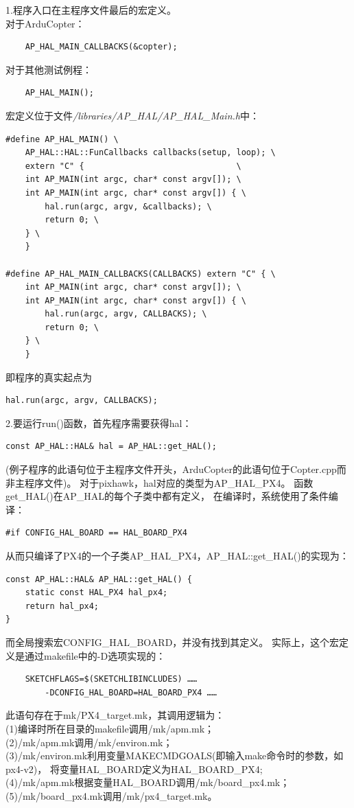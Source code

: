 \documentclass[a4paper,10pt]{ctexart} %
\begin{document}
1.程序入口在主程序文件最后的宏定义。\\
\noindent 对于ArduCopter：
\begin{lstlisting}
	AP_HAL_MAIN_CALLBACKS(&copter);
\end{lstlisting}
对于其他测试例程：
\begin{lstlisting}
	AP_HAL_MAIN();
\end{lstlisting}
宏定义位于文件\textit{/libraries/AP\_HAL/AP\_HAL\_Main.h}中：
\begin{lstlisting}
#define AP_HAL_MAIN() \
    AP_HAL::HAL::FunCallbacks callbacks(setup, loop); \
    extern "C" {                               \
    int AP_MAIN(int argc, char* const argv[]); \
    int AP_MAIN(int argc, char* const argv[]) { \
        hal.run(argc, argv, &callbacks); \
        return 0; \
    } \
    }

#define AP_HAL_MAIN_CALLBACKS(CALLBACKS) extern "C" { \
    int AP_MAIN(int argc, char* const argv[]); \
    int AP_MAIN(int argc, char* const argv[]) { \
        hal.run(argc, argv, CALLBACKS); \
        return 0; \
    } \
    }

\end{lstlisting}
即程序的真实起点为
\begin{lstlisting}
hal.run(argc, argv, CALLBACKS);
\end{lstlisting}

2.要运行run()函数，首先程序需要获得hal：
\begin{lstlisting}
const AP_HAL::HAL& hal = AP_HAL::get_HAL();
\end{lstlisting}
(例子程序的此语句位于主程序文件开头，ArduCopter的此语句位于Copter.cpp而非主程序文件)。
对于pixhawk，hal对应的类型为AP\_HAL\_PX4。
函数get\_HAL()在AP\_HAL的每个子类中都有定义，
在编译时，系统使用了条件编译：
\begin{lstlisting}
#if CONFIG_HAL_BOARD == HAL_BOARD_PX4
\end{lstlisting}
从而只编译了PX4的一个子类AP\_HAL\_PX4，AP\_HAL::get\_HAL()的实现为：
\begin{lstlisting}
const AP_HAL::HAL& AP_HAL::get_HAL() {
    static const HAL_PX4 hal_px4;
    return hal_px4;
}
\end{lstlisting}
而全局搜索宏CONFIG\_HAL\_BOARD，并没有找到其定义。
实际上，这个宏定义是通过makefile中的-D选项实现的：

\begin{lstlisting}
	SKETCHFLAGS=$(SKETCHLIBINCLUDES) ……
	 	-DCONFIG_HAL_BOARD=HAL_BOARD_PX4 ……
\end{lstlisting}
此语句存在于mk/PX4\_target.mk，其调用逻辑为：\\
(1)编译时所在目录的makefile调用/mk/apm.mk；\\
(2)/mk/apm.mk调用/mk/environ.mk；\\
(3)/mk/environ.mk利用变量MAKECMDGOALS(即输入make命令时的参数，如px4-v2)，
将变量HAL\_BOARD定义为HAL\_BOARD\_PX4;\\
(4)/mk/apm.mk根据变量HAL\_BOARD调用/mk/board\_px4.mk；\\
(5)/mk/board\_px4.mk调用/mk/px4\_target.mk。
\end{document}
